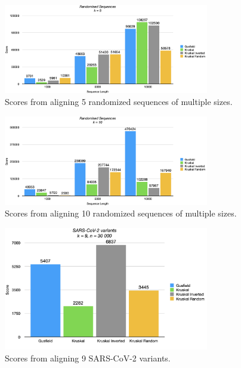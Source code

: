 \documentclass[twoside,openright,titlepage,numbers=noenddot,headinclude,%
                footinclude=true,cleardoublepage=empty,abstractoff, %
                BCOR=5mm,paper=a4,fontsize=11pt,%
                ngerman,american,%
                ]{scrreprt}
\begin{document}
\begin{figure}[H]
\includegraphics[width=0.8\textwidth]{chart-2.png}
\centering
\caption{Scores from aligning 5 randomized sequences of multiple sizes.}
\label{fig:chart-2}
\end{figure}

\begin{figure}[H]
\includegraphics[width=0.8\textwidth]{chart-3.png}
\centering
\caption{Scores from aligning 10 randomized sequences of multiple sizes.}
\label{fig:chart-3}
\end{figure}

\begin{figure}[H]
\includegraphics[width=0.8\textwidth]{chart-4.png}
\centering
\caption{Scores from aligning 9 SARS-CoV-2 variants.}
\label{fig:chart-4}
\end{figure}
\end{document}

